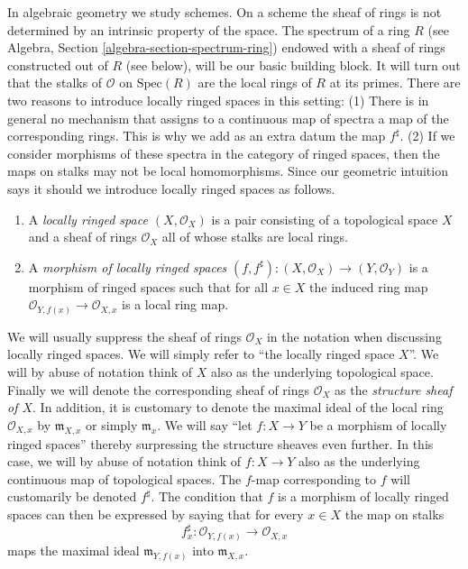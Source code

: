 \medskip\noindent
In algebraic geometry we study schemes. On a scheme the sheaf of rings
is not determined by an intrinsic property of the space.
The spectrum of a ring $R$
(see Algebra, Section \ref{algebra-section-spectrum-ring}) endowed
with a sheaf of rings constructed out of $R$ (see below),
will be our basic building block. It will turn out that
the stalks of $\mathcal{O}$ on $\text{Spec}(R)$ are the local
rings of $R$ at its primes. There are two reasons to introduce
locally ringed spaces in this setting: (1) There is in general
no mechanism that assigns to a continuous map of spectra a
map of the corresponding rings. This is why we add as an extra datum
the map $f^\sharp$. (2) If we consider morphisms
of these spectra in the category of ringed spaces, then the
maps on stalks may not be local homomorphisms. Since our
geometric intuition says it should we introduce locally ringed spaces
as follows.

\begin{definition}
\label{definition-locally-ringed-space}
\begin{enumerate}
\item A {\it locally ringed space $(X,\mathcal{O}_X)$}
is a pair consisting of a
topological space $X$ and a sheaf of rings $\mathcal{O}_X$ all of whose stalks
are local rings.
\item A {\it morphism of locally ringed spaces}
$(f, f^\sharp) : (X, \mathcal{O}_X) \to (Y,\mathcal{O}_Y)$
is a morphism of ringed spaces such that for all $x \in X$
the induced ring map $\mathcal{O}_{Y,f(x)} \to \mathcal{O}_{X,x}$ is a
local ring map.
\end{enumerate}
\end{definition}

\noindent
We will usually suppress the sheaf of rings $\mathcal{O}_X$
in the notation when discussing locally ringed spaces. We will
simply refer to ``the locally ringed space $X$''.
We will by abuse of notation think of $X$ also as
the underlying topological space. Finally we will denote
the corresponding sheaf of rings
$\mathcal{O}_X$ as the {\it structure sheaf of $X$}.
In addition, it is customary to denote the maximal ideal
of the local ring $\mathcal{O}_{X, x}$ by
$\mathfrak{m}_{X,x}$ or simply $\mathfrak{m}_x$.
We will say ``let $f : X \to Y$ be a morphism of locally ringed
spaces'' thereby surpressing the structure sheaves even further.
In this case, we will by abuse of notation think of $f : X\to Y$
also as the underlying continuous map of topological spaces.
The $f$-map corresponding to $f$ will customarily
be denoted $f^\sharp$. The condition that $f$ is a morphism
of locally ringed spaces can then be expressed by saying that
for every $x\in X$ the map on stalks
$$
f^\sharp_x : \mathcal{O}_{Y,f(x)} \longrightarrow \mathcal{O}_{X, x}
$$
maps the maximal ideal $\mathfrak m_{Y, f(x)}$ into
$\mathfrak m_{X, x}$.

